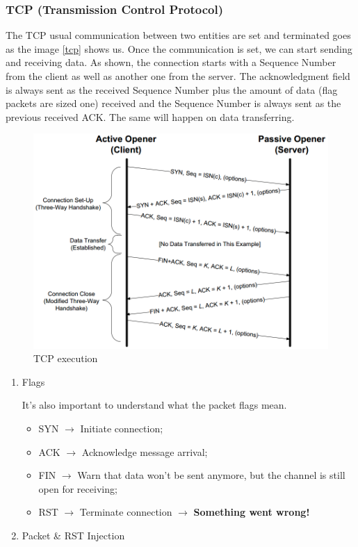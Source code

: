 \documentclass[11pt]{article}
\begin{document}
{\subsubsection{TCP (Transmission Control Protocol)}
\label{sec:orgad54d88}
The TCP usual communication between two entities are set and terminated goes as the image \ref{tcp} shows us. Once the communication is set, we can start sending and receiving data. As shown, the connection starts with a Sequence Number from the client as well as another one from the server. The acknowledgment field is always sent as the received Sequence Number plus the amount of data (flag packets are sized one) received and the Sequence Number is always sent as the previous received ACK. The same will happen on data transferring.  

\begin{figure}[htbp]
\centering
\includegraphics[height=0.5\textwidth]{res/TCP.png}
\caption{\label{fig:org487b4e7}TCP execution}
\end{figure} 

\begin{enumerate}
\item Flags
\label{sec:org750246b}

It's also important to understand what the packet flags mean.
\begin{itemize}
\item SYN \(\to\) Initiate connection;
\item ACK \(\to\) Acknowledge message arrival;
\item FIN \(\to\) Warn that data won't be sent anymore, but the channel is still open for receiving;
\item RST \(\to\) Terminate connection \(\to\) \textbf{Something went wrong!}
\end{itemize}
\item Packet \& RST Injection
\label{sec:org4cba98c}


\end{enumerate}}
\end{document}
